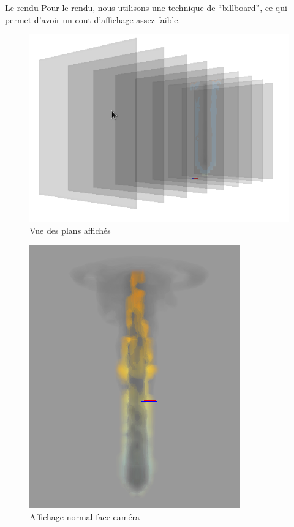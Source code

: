 \documentclass{beamer}
\begin{document}
\begin{frame}{Le rendu}
  Pour le rendu, nous utilisons une technique de ``billboard'', ce qui
  permet d'avoir un cout d'affichage assez faible.
  \begin{minipage}{0.48\linewidth} 
    \begin{figure}[!h]
      \centering\includegraphics[scale=0.3]{Render3D.png}
      \caption{Vue des plans affichés}
      \label{PlanAffiche}
    \end{figure}
  \end{minipage}
  \begin{minipage}{0.48\linewidth}
    \begin{figure}[!h]
      \centering\includegraphics[scale=0.2]{Render3D3.png}
      \caption{Affichage normal face caméra}
      \label{VueFaceCam}
    \end{figure}
  \end{minipage}
\end{frame}
\end{document}
